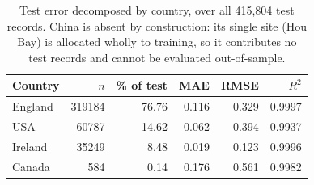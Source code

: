 \begin{table}[!t]
    \centering
    \caption{Test error decomposed by country, over all 415{,}804 test records. China is absent by construction: its single site (Hou Bay) is allocated wholly to training, so it contributes no test records and cannot be evaluated out-of-sample.}
    \label{tab:country}
    \small
    \setlength{\tabcolsep}{4pt}
    \begin{tabular}{lrrrrr}
        \toprule
        Country & $n$ & \% of test & MAE & RMSE & $R^2$ \\
        \midrule
        England & 319184 & 76.76 & 0.116 & 0.329 & 0.9997 \\
        USA & 60787 & 14.62 & 0.062 & 0.394 & 0.9937 \\
        Ireland & 35249 & 8.48 & 0.019 & 0.123 & 0.9996 \\
        Canada & 584 & 0.14 & 0.176 & 0.561 & 0.9982 \\
        \bottomrule
    \end{tabular}
\end{table}
